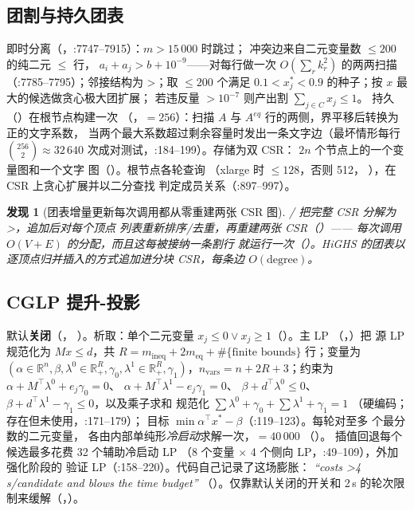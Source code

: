 \documentclass[11pt]{ctexart}
\newtheorem{finding}{发现}
\newcommand{\R}{\mathbb{R}}
\begin{document}
\subsection{团割与持久团表}
\label{sec:clique}
即时分离（，:7747--7915）：$m > 15\,000$ 时跳过；
冲突边来自二元变量数 $\le 200$ 的纯二元 $\le$ 行，
$a_i + a_j > b + 10^{-9}$——对每行做一次 $O(\sum_r k_r^2)$ 的两两扫描
（:7785--7795）；邻接结构为 >；取 $\le 200$
个满足 $0.1 < x_j^* < 0.9$ 的种子；按 $x$ 最大的候选做贪心极大团扩展；
若违反量 $>10^{-7}$ 则产出割 $\sum_{j \in C} x_j \le 1$。
持久 （）在根节点构建一次
（，$=256$）：扫描 $A$
与 $A^{eq}$ 行的两侧，界平移后转换为正的文字系数，
当两个最大系数超过剩余容量时发出一条文字边（最坏情形每行
$\binom{256}{2} \approx 32\,640$ 次成对测试，:184--199）。存储为双 CSR：
$2n$ 个节点上的一个变量图和一个文字
图（）。根节点各轮查询
（xlarge 时 $\le 128$，否则 512，
），在 CSR 上贪心扩展并以二分查找
判定成员关系（:897--997）。

\begin{finding}[团表增量更新每次调用都从零重建两张 CSR 图]
/ 把完整 CSR 分解为
>，追加后对每个顶点
列表重新排序/去重，再重建两张 CSR（）——
每次调用 $O(V{+}E)$ 的分配，而且这\emph{每被接纳一条割行}
就运行一次（）。HiGHS 的团表以
逐顶点归并插入的方式追加进分块 CSR，每条边 $O(\mathrm{degree})$。
\end{finding}

\subsection{CGLP 提升-投影}
\label{sec:cglp}
默认\textbf{关闭}（，
）。析取：单个二元变量
$x_j \le 0 \lor x_j \ge 1$（）。主 LP
（，）把
源 LP 规范化为 $Mx \le d$，共 $R = m_{\mathrm{ineq}} + 2 m_{\mathrm{eq}} +
\#\{\text{finite bounds}\}$ 行；变量为
$(\alpha \in \R^n, \beta, \lambda^0 \in \R_+^R, \gamma_0, \lambda^1 \in
\R_+^R, \gamma_1)$，$n_{\mathrm{vars}} = n + 2R + 3$；约束为
$\alpha + M^\top \lambda^0 + e_j \gamma_0 = 0$、
$\alpha + M^\top \lambda^1 - e_j \gamma_1 = 0$、
$\beta + d^\top \lambda^0 \le 0$、
$\beta + d^\top \lambda^1 - \gamma_1 \le 0$，以及乘子求和
规范化 $\sum \lambda^0 + \gamma_0 + \sum \lambda^1 + \gamma_1 = 1$
（硬编码； 存在但未使用，:171--179）；
目标 $\min \alpha^\top x^* - \beta$（:119--123）。每轮对至多
 个最分数的二元变量，
各由内部单纯形\emph{冷启动}求解一次，$=40\,000$
（）。
插值回退每个候选最多花费 32 个辅助冷启动 LP
（8 个变量 $\times$ 4 个侧向 LP，:49--109），外加强化阶段的
验证 LP（:158--220）。代码自己记录了这场膨胀：
\emph{``costs >4\,s/candidate and blows the time budget''}
（）。仅靠默认关闭的开关和
2\,s 的轮次限制来缓解（，）。
\end{document}
